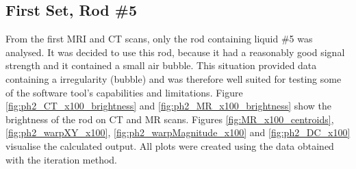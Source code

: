 \subsection{First Set, Rod \#5}

From the first MRI and CT scans, only the rod containing liquid \#5 was analysed.
It was decided to use this rod, because it had a reasonably good signal strength and it contained a small air bubble.
This situation provided data containing a irregularity (bubble) and was therefore well suited for testing some of the software tool's capabilities and limitations.
Figure \ref{fig:ph2_CT_x100_brightness} and \ref{fig:ph2_MR_x100_brightness} show the brightness of the rod on CT and MR scans.
Figures \ref{fig:MR_x100_centroids}, \ref{fig:ph2_warpXY_x100}, \ref{fig:ph2_warpMagnitude_x100} and \ref{fig:ph2_DC_x100} visualise the calculated output.
All plots were created using the data obtained with the iteration method.

